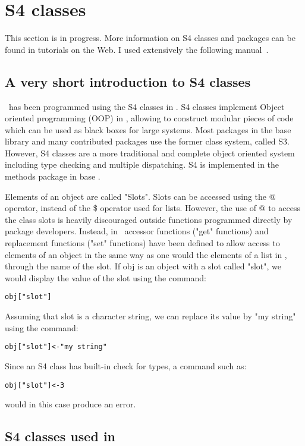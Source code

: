 \chapter{S4 classes} \label{chapter_classS4}

This section is in progress. More information on S4 classes and \R packages can be found in tutorials on the Web. I used extensively the following manual~\cite{Genolini}.

\section{A very short introduction to S4 classes} \label{sec:introS4}

\monolix~has been programmed using the S4 classes in \R. S4 classes implement Object oriented programming (OOP) in \R, allowing to construct modular pieces of code which can be used as black boxes for large systems. Most packages in the base library and many contributed packages use the former class system, called S3. However, S4 classes are a more traditional and complete object oriented system including type checking and multiple dispatching. S4 is implemented in the methods package in base \R.

Elements of an object are called "Slots". Slots can be accessed using the @ operator, instead of the \$ operator used for lists. However, the use of @ to access the class slots is heavily discouraged outside functions programmed directly by package developers. Instead, in \monolix~accessor functions ("get" functions) and replacement functions ("set" functions) have been defined to allow access to elements of an object in the same way as one would the elements of a list in \R, through the name of the slot. If {\sf obj} is an object with a slot called "slot", we would display the value of the slot using the command:
\begin{verbatim}
obj["slot"]
\end{verbatim}
Assuming that slot is a character string, we can replace its value by "my string" using the command:
\begin{verbatim}
obj["slot"]<-"my string"
\end{verbatim}
Since an S4 class has built-in check for types, a command such as:
\begin{verbatim}
obj["slot"]<-3
\end{verbatim}
would in this case produce an error.

\section{S4 classes used in \monolix} \label{sec:saemixS4}

